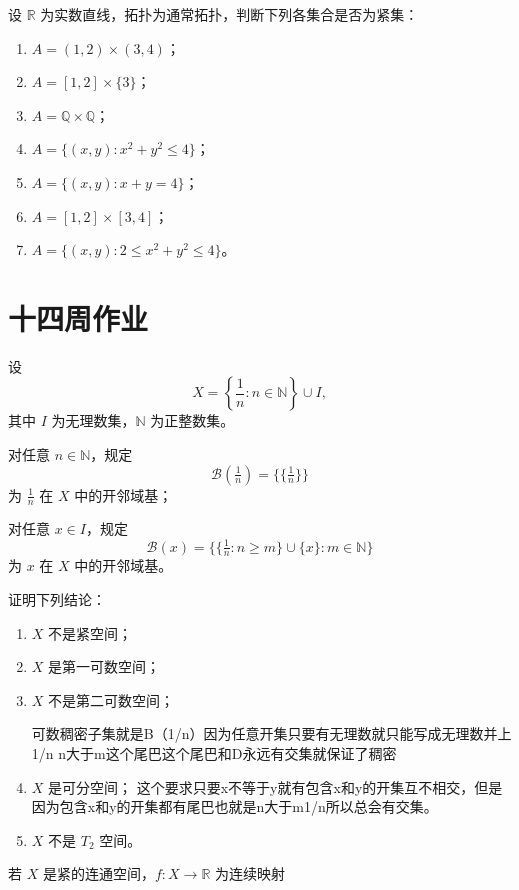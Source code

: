 \begin{homework}[12]
设 $\mathbb{R}$ 为实数直线，拓扑为通常拓扑，判断下列各集合是否为紧集：
\begin{enumerate}
  \item $A=(1,2)\times(3,4)$；
  \item $A=[1,2]\times\{3\}$；
  \item $A=\mathbb{Q}\times\mathbb{Q}$；
  \item $A=\{(x,y):x^{2}+y^{2}\le 4\}$；
  \item $A=\{(x,y):x+y=4\}$；
  \item $A=[1,2]\times[3,4]$；
  \item $A=\{(x,y):2\le x^{2}+y^{2}\le 4\}$。
\end{enumerate}
\end{homework}
\section{十四周作业}
\begin{homework}[13]
设
\[
X=\left\{\frac{1}{n}:n\in\mathbb{N}\right\}\cup I,
\]
其中 $I$ 为无理数集，$\mathbb{N}$ 为正整数集。

对任意 $n\in\mathbb{N}$，规定
\[
\mathcal{B}\!\left(\tfrac{1}{n}\right)=\bigl\{\{\tfrac{1}{n}\}\bigr\}
\]
为 $\tfrac{1}{n}$ 在 $X$ 中的开邻域基；

对任意 $x\in I$，规定
\[
\mathcal{B}(x)
=
\bigl\{\{\tfrac{1}{n}:n\ge m\}\cup\{x\}:m\in\mathbb{N}\bigr\}
\]
为 $x$ 在 $X$ 中的开邻域基。

证明下列结论：
\begin{enumerate}
\begin{dxtips}
    紧空间任意开覆盖都需要有限子覆盖，有限子覆盖只能覆盖有有限个1/n。第二题每一个x都需要有可数邻域基，题目中已经给了每一个x可数开邻域基了。
    第二可数要求有一个可数开邻域基，所有的开集都能用这个可数开邻域基中元素表述，如果有可数开邻域基，那么任意包含x的开集都有基中元素Bx属于Ux，可以等于就是基中总有比任何开集都小的集合因为基本来就是可以生成所有开集。
\end{dxtips}
  \item $X$ 不是紧空间；
  \item $X$ 是第一可数空间；
  \item $X$ 不是第二可数空间；
  \begin{dxtips}
      可数稠密子集就是B（1/n）因为任意开集只要有无理数就只能写成无理数并上1/n n大于m这个尾巴这个尾巴和D永远有交集就保证了稠密
  \end{dxtips}
  \item $X$ 是可分空间；
  这个要求只要x不等于y就有包含x和y的开集互不相交，但是因为包含x和y的开集都有尾巴也就是n大于m{1/n}所以总会有交集。
  \item $X$ 不是 $T_2$ 空间。
\end{enumerate}
\end{homework}
\begin{homework}[14]
若 $X$ 是紧的连通空间，$f:X\to\mathbb{R}$ 为连续映射
\end{homework}
